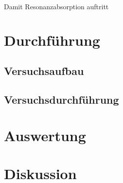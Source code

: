Damit Resonanzabsorption auftritt

\section{Durchführung}
\subsection{Versuchsaufbau}
\subsection{Versuchsdurchführung}
\section{Auswertung}

\section{Diskussion}

\newpage
\nocite{*}
\printbibliography
